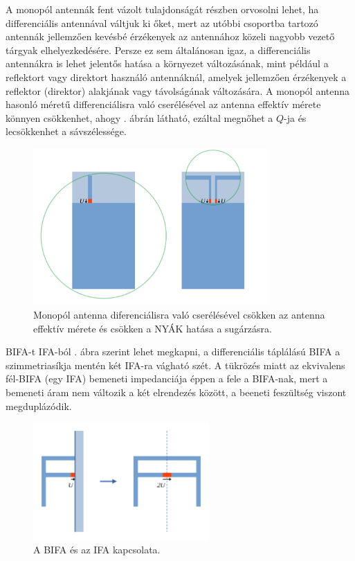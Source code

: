 \par A monopól antennák fent vázolt tulajdonságát részben orvosolni lehet, ha differenciális antennával váltjuk ki őket, mert az utóbbi csoportba tartozó antennák jellemzően kevésbé érzékenyek az antennához közeli nagyobb vezető tárgyak elhelyezkedésére. Persze ez sem általánosan igaz, a differenciális antennákra is lehet jelentős hatása a környezet változásának, mint például a reflektort vagy direktort használó antennáknál, amelyek jellemzően érzékenyek a reflektor (direktor) alakjának vagy távolságának változására. A monopól antenna hasonló méretű differenciálisra való cserélésével az antenna effektív mérete könnyen csökkenhet, ahogy . ábrán látható, ezáltal megnőhet a $Q$-ja és lecsökkenhet a sávszélessége.
\begin{figure}[h]
	\centering
	\includegraphics[width=0.8\textwidth]{kep/se-diff.pdf}
	\caption{Monopól antenna diferenciálisra való cserélésével csökken az antenna effektív mérete és csökken a NYÁK hatása a sugárzásra.}
	\label{fig:se-diff}
\end{figure}
\par BIFA-t IFA-ból . ábra szerint lehet megkapni, a differenciális táplálású BIFA a szimmetriasíkja mentén két IFA-ra vágható szét. A tükrözés miatt az ekvivalens fél-BIFA (egy IFA) bemeneti impedanciája éppen a fele a BIFA-nak, mert a bemeneti áram nem változik a két elrendezés között, a beeneti feszültség viszont megduplázódik.
\begin{figure}[h]
	\centering
	\includegraphics[width=0.6\textwidth]{kep/ifa-bifa.pdf}
	\caption{A BIFA és az IFA kapcsolata.}
	\label{fig:ifa-bifa}
\end{figure}